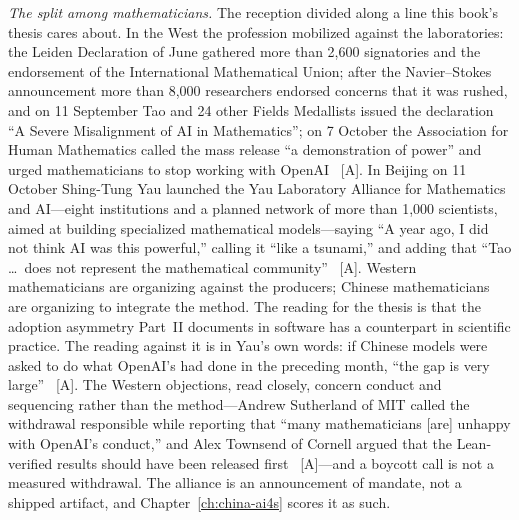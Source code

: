 \emph{The split among mathematicians.} The reception divided along a line this book's thesis cares about. In the West the profession mobilized against the laboratories: the Leiden Declaration of June gathered more than 2,600 signatories and the endorsement of the International Mathematical Union; after the Navier--Stokes announcement more than 8,000 researchers endorsed concerns that it was rushed, and on 11 September Tao and 24 other Fields Medallists issued the declaration ``A Severe Misalignment of AI in Mathematics''; on 7 October the Association for Human Mathematics called the mass release ``a demonstration of power'' and urged mathematicians to stop working with OpenAI~\cite{sci-sciam-openai,sci-rw-openai} [A]. In Beijing on 11 October Shing-Tung Yau launched the Yau Laboratory Alliance for Mathematics and AI---eight institutions and a planned network of more than 1,000 scientists, aimed at building specialized mathematical models---saying ``A year ago, I did not think AI was this powerful,'' calling it ``like a tsunami,'' and adding that ``Tao \ldots\ does not represent the mathematical community''~\cite{sci-yau-alliance,sci-officechai} [A]. Western mathematicians are organizing against the producers; Chinese mathematicians are organizing to integrate the method. The reading for the thesis is that the adoption asymmetry Part~II documents in software has a counterpart in scientific practice. The reading against it is in Yau's own words: if Chinese models were asked to do what OpenAI's had done in the preceding month, ``the gap is very large''~\cite{sci-yau-alliance} [A]. The Western objections, read closely, concern conduct and sequencing rather than the method---Andrew Sutherland of MIT called the withdrawal responsible while reporting that ``many mathematicians [are] unhappy with OpenAI's conduct,'' and Alex Townsend of Cornell argued that the Lean-verified results should have been released first~\cite{sci-rw-openai} [A]---and a boycott call is not a measured withdrawal. The alliance is an announcement of mandate, not a shipped artifact, and Chapter~\ref{ch:china-ai4s} scores it as such.

